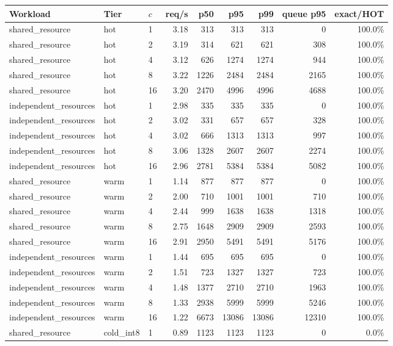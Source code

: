 \begin{tabular}{lllrrrrrr}
\toprule
Workload & Tier & $c$ & req/s & p50 & p95 & p99 & queue p95 & exact/HOT \\
\midrule
shared\_resource & hot & 1 & 3.18 & 313 & 313 & 313 & 0 & 100.0\% \\
shared\_resource & hot & 2 & 3.19 & 314 & 621 & 621 & 308 & 100.0\% \\
shared\_resource & hot & 4 & 3.12 & 626 & 1274 & 1274 & 944 & 100.0\% \\
shared\_resource & hot & 8 & 3.22 & 1226 & 2484 & 2484 & 2165 & 100.0\% \\
shared\_resource & hot & 16 & 3.20 & 2470 & 4996 & 4996 & 4688 & 100.0\% \\
independent\_resources & hot & 1 & 2.98 & 335 & 335 & 335 & 0 & 100.0\% \\
independent\_resources & hot & 2 & 3.02 & 331 & 657 & 657 & 328 & 100.0\% \\
independent\_resources & hot & 4 & 3.02 & 666 & 1313 & 1313 & 997 & 100.0\% \\
independent\_resources & hot & 8 & 3.06 & 1328 & 2607 & 2607 & 2274 & 100.0\% \\
independent\_resources & hot & 16 & 2.96 & 2781 & 5384 & 5384 & 5082 & 100.0\% \\
shared\_resource & warm & 1 & 1.14 & 877 & 877 & 877 & 0 & 100.0\% \\
shared\_resource & warm & 2 & 2.00 & 710 & 1001 & 1001 & 710 & 100.0\% \\
shared\_resource & warm & 4 & 2.44 & 999 & 1638 & 1638 & 1318 & 100.0\% \\
shared\_resource & warm & 8 & 2.75 & 1648 & 2909 & 2909 & 2593 & 100.0\% \\
shared\_resource & warm & 16 & 2.91 & 2950 & 5491 & 5491 & 5176 & 100.0\% \\
independent\_resources & warm & 1 & 1.44 & 695 & 695 & 695 & 0 & 100.0\% \\
independent\_resources & warm & 2 & 1.51 & 723 & 1327 & 1327 & 723 & 100.0\% \\
independent\_resources & warm & 4 & 1.48 & 1377 & 2710 & 2710 & 1963 & 100.0\% \\
independent\_resources & warm & 8 & 1.33 & 2938 & 5999 & 5999 & 5246 & 100.0\% \\
independent\_resources & warm & 16 & 1.22 & 6673 & 13086 & 13086 & 12310 & 100.0\% \\
shared\_resource & cold\_int8 & 1 & 0.89 & 1123 & 1123 & 1123 & 0 & 0.0\% \\

\end{tabular}
